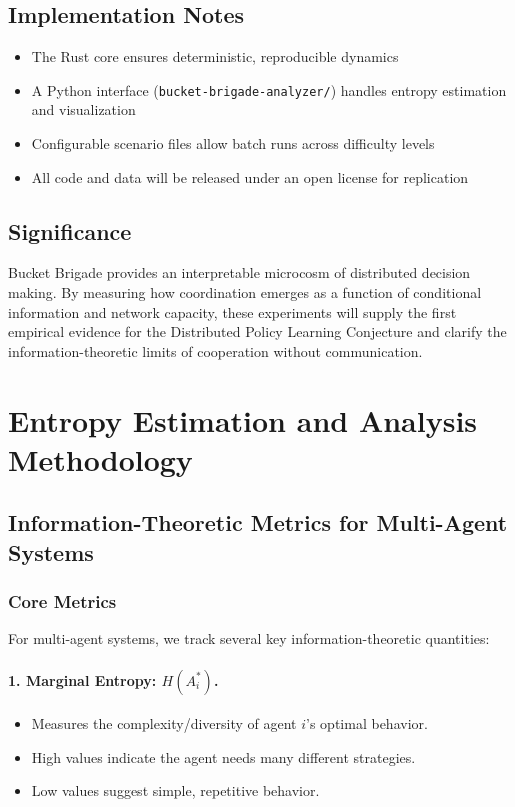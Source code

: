 \documentclass[10pt, letterpaper]{article}
\begin{document}
\subsection{Implementation Notes}

\begin{itemize}
    \item The Rust core ensures deterministic, reproducible dynamics
    \item A Python interface (\texttt{bucket-brigade-analyzer/}) handles entropy estimation and visualization
    \item Configurable scenario files allow batch runs across difficulty levels
    \item All code and data will be released under an open license for replication
\end{itemize}

\subsection{Significance}

Bucket Brigade provides an interpretable microcosm of distributed decision making. By measuring how coordination emerges as a function of conditional information and network capacity, these experiments will supply the first empirical evidence for the Distributed Policy Learning Conjecture and clarify the information-theoretic limits of cooperation without communication.

\section{Entropy Estimation and Analysis Methodology}
\label{app:entropy}

\subsection{Information-Theoretic Metrics for Multi-Agent Systems}

\subsubsection{Core Metrics}

For multi-agent systems, we track several key information-theoretic quantities:

\paragraph{1. Marginal Entropy: $H(A_i^*)$.}
\begin{itemize}
    \item Measures the complexity/diversity of agent $i$'s optimal behavior.
    \item High values indicate the agent needs many different strategies.
    \item Low values suggest simple, repetitive behavior.
\end{itemize}
\end{document}

